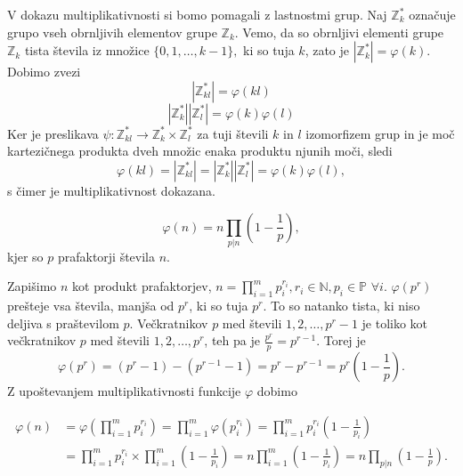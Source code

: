 \documentclass[mat1]{fmfdelo}
\begin{document}
\begin{dokaz}
V dokazu multiplikativnosti si bomo pomagali z lastnostmi grup. 
Naj $\mathbb{Z}_{k}^\ast $ označuje grupo vseh obrnljivih elementov grupe $\mathbb{Z}_{k}$. Vemo, da so obrnljivi elementi grupe $\mathbb{Z}_{k}$ tista števila iz množice \( \{0, 1, \ldots, k-1 \}, \) ki so tuja $k$, zato je $|\mathbb{Z}_{k}^\ast| = \varphi(k).$  Dobimo zvezi
\[ |\mathbb{Z}_{kl}^\ast| = \varphi(kl) \]
\[ |\mathbb{Z}_{k}^\ast| |\mathbb{Z}_{l}^\ast| = \varphi(k) \varphi(l)\]
Ker je preslikava \( \psi \colon \mathbb{Z}_{kl}^\ast \rightarrow \mathbb{Z}_{k}^\ast \times \mathbb{Z}_{l}^\ast \) za tuji števili $k$ in $l$ izomorfizem grup in je moč kartezičnega produkta dveh množic enaka produktu njunih moči, sledi 
\[ \varphi(kl) = |\mathbb{Z}_{kl}^\ast| = |\mathbb{Z}_{k}^\ast| |\mathbb{Z}_{l}^\ast| = \varphi(k) \varphi(l), \]
s čimer je multiplikativnost dokazana.
\end{dokaz}

\begin{trditev}
\label{trd:EulerPrastProd}
\[ \varphi(n) = n \prod_{p|n} \left (1 - \frac{1}{p} \right ), \] kjer so $p$ prafaktorji števila $n$.
\end{trditev}

\begin{dokaz}
Zapišimo $n$ kot produkt prafaktorjev, \( n = \prod_{i=1}^m p_i^{r_i}, r_i \in \mathbb{N}, p_i \in \mathbb{P} \) $\forall i$.
$\varphi(p^{r})$ prešteje vsa števila, manjša od $p^r$, ki so tuja $p^r$. To so natanko tista, ki niso deljiva s praštevilom $p$. Večkratnikov $p$ med števili $1, 2, \ldots, p^r-1$ je toliko kot večkratnikov $p$ med števili $1, 2, \ldots, p^r$, teh pa je \( \frac{p^r}{p} = p^{r-1}. \)
Torej je \[ \varphi(p^r) = (p^r - 1) - (p^{r-1} - 1) = p^r - p^{r-1} = p^r \left (1 - \frac{1}{p} \right). \] 
Z upoštevanjem multiplikativnosti funkcije $\varphi$ dobimo

\begin{align*}
 \varphi(n) 
 &= \varphi \left (\prod_{i=1}^m p_i^{r_i} \right ) = \prod_{i=1}^m \varphi (p_i^{r_i} ) = 
 \prod_{i=1}^m p_i^{r_i} \left (1 - \frac{1}{p_i} \right ) \\
 &= \prod_{i=1}^m p_i^{r_i} \times \prod_{i=1}^m \left (1 - \frac{1}{p_i} \right ) = 
 n \prod_{i=1}^m \left (1 - \frac{1}{p_i} \right ) = n \prod_{p|n} \left (1 - \frac{1}{p} \right ).
\end{align*}

\end{dokaz}

\end{document}
